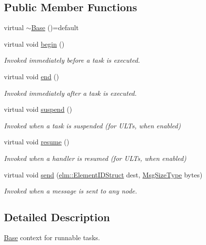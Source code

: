 \subsection*{Public Member Functions}
\begin{DoxyCompactItemize}
\item 
virtual \hyperlink{structvt_1_1ctx_1_1_base_a11811118c1c91d93e7679610bf8377f2}{$\sim$\+Base} ()=default
\item 
virtual void \hyperlink{structvt_1_1ctx_1_1_base_aab5524952e1bb163ccba5df64a303168}{begin} ()
\begin{DoxyCompactList}\small\item\em Invoked immediately before a task is executed. \end{DoxyCompactList}\item 
virtual void \hyperlink{structvt_1_1ctx_1_1_base_a113bac732b2831caa8eed11609ccaf0e}{end} ()
\begin{DoxyCompactList}\small\item\em Invoked immediately after a task is executed. \end{DoxyCompactList}\item 
virtual void \hyperlink{structvt_1_1ctx_1_1_base_a445badaaad72b44313084b2c95a13003}{suspend} ()
\begin{DoxyCompactList}\small\item\em Invoked when a task is suspended (for U\+L\+Ts, when enabled) \end{DoxyCompactList}\item 
virtual void \hyperlink{structvt_1_1ctx_1_1_base_a303afabb40ed83057fbe30c744db95da}{resume} ()
\begin{DoxyCompactList}\small\item\em Invoked when a handler is resumed (for U\+L\+Ts, when enabled) \end{DoxyCompactList}\item 
virtual void \hyperlink{structvt_1_1ctx_1_1_base_a8b641dd9a36fc6b60a6ac35e0126076d}{send} (\hyperlink{structvt_1_1elm_1_1_element_i_d_struct}{elm\+::\+Element\+I\+D\+Struct} dest, \hyperlink{namespacevt_a408e86a8c7c89309b52907dc5a513924}{Msg\+Size\+Type} bytes)
\begin{DoxyCompactList}\small\item\em Invoked when a message is sent to any node. \end{DoxyCompactList}\end{DoxyCompactItemize}


\subsection{Detailed Description}
\hyperlink{structvt_1_1ctx_1_1_base}{Base} context for runnable tasks. 

